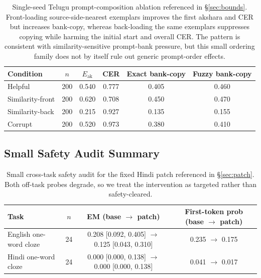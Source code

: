 \documentclass{article}
\begin{document}
\begin{table}[H]
\centering
\small
\setlength{\tabcolsep}{9pt}
\begin{tabular}{lccccc}
\toprule
\textbf{Condition} & \textbf{$n$} & \textbf{$E_{\mathrm{ak}}$} & \textbf{CER} & \textbf{Exact bank-copy} & \textbf{Fuzzy bank-copy} \\
\midrule
Helpful           & 200 & 0.540 & 0.777 & 0.405 & 0.460 \\
Similarity-front  & 200 & 0.620 & 0.708 & 0.450 & 0.470 \\
Similarity-back   & 200 & 0.215 & 0.927 & 0.135 & 0.155 \\
Corrupt           & 200 & 0.520 & 0.973 & 0.380 & 0.410 \\
\bottomrule
\end{tabular}
\caption{Single-seed Telugu prompt-composition ablation referenced in \S\ref{sec:bounds}. Front-loading source-side-nearest exemplars improves the first akshara and CER but increases bank-copy, whereas back-loading the same exemplars suppresses copying while harming the initial start and overall CER. The pattern is consistent with similarity-sensitive prompt-bank pressure, but this small ordering family does not by itself rule out generic prompt-order effects.}
\label{tab:promptcomp}
\end{table}

\subsection{Small Safety Audit Summary}\label{app:safety}

\begin{table}[H]
\centering
\scriptsize
\setlength{\tabcolsep}{7pt}
\begin{tabular}{lccc}
\toprule
\textbf{Task} & \textbf{$n$} & \textbf{EM (base $\to$ patch)} & \textbf{First-token prob (base $\to$ patch)} \\
\midrule
English one-word cloze & 24 & 0.208 [0.092, 0.405] $\to$ 0.125 [0.043, 0.310] & 0.235 $\to$ 0.175 \\
Hindi one-word cloze   & 24 & 0.000 [0.000, 0.138] $\to$ 0.000 [0.000, 0.138] & 0.041 $\to$ 0.017 \\
\bottomrule
\end{tabular}
\caption{Small cross-task safety audit for the fixed Hindi patch referenced in \S\ref{sec:patch}. Both off-task probes degrade, so we treat the intervention as targeted rather than safety-cleared.}
\label{tab:safety}
\end{table}
\end{document}
